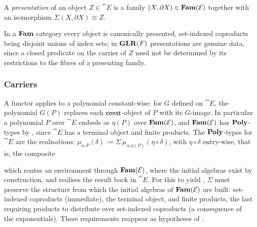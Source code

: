 \begin{definition}[Presentation]
\label{def:conservativity:presentation}
A \emph{presentation} of an object $Z \in \cat{E}$ is a family $(X, \partial X) \in
\mathbf{Fam}(\mathcal{E})$ together with an isomorphism $\Sigma(X, \partial X) \cong Z$.
\end{definition}

\noindent
In a $\mathbf{Fam}$ category every
object is canonically presented, set-indexed coproducts being disjoint unions of index sets; in
$\mathbf{GLR}(F)$ presentations are genuine data, since a closed predicate on the carrier of $Z$ need not
be determined by its restrictions to the fibres of a presenting family.

\subsubsection{Carriers}
\label{sec:conservativity:carriers}
A functor applies to a polynomial constant-wise: for $G$ defined on $\cat{E}$, the polynomial
$G(P)$ replaces each $\mathsf{const}$-object of $P$ with its $G$-image. In particular a polynomial $P$
over $\cat{E}$ embeds as $\eta(P)$ over $\mathbf{Fam}(\mathcal{E})$, and $\mathbf{Fam}(\mathcal{E})$ has $\mathbf{Poly}$-types
by , since $\cat{E}$ has a terminal object and finite
products. The $\mathbf{Poly}$-types for $\cat{E}$ are the realisations: $\mu_{\alpha.P}(\delta) :=
\Sigma\, \mu_{\alpha.\eta(P)}(\eta \circ \delta)$, with $\eta \circ \delta$ entry-wise,
that is, the composite
\begin{center}
\end{center}
\noindent
which routes an environment through $\mathbf{Fam}(\mathcal{E})$, where the initial algebras exist by
construction, and realises the result back in $\cat{E}$. For this to yield
, $\Sigma$ must preserve the structure from which
the initial algebras of $\mathbf{Fam}(\mathcal{E})$ are built:
set-indexed coproducts (immediate), the terminal object, and finite products, the last requiring
products to distribute over set-indexed coproducts (a consequence of the exponentials). These
requirements reappear as hypotheses of .

